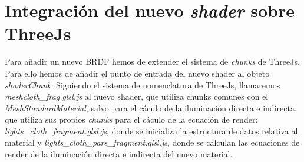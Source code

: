 




\vspace{1cm}
\section{Integraci\'on del nuevo \textit{shader} sobre ThreeJs}
  Para a\~nadir un nuevo BRDF hemos de extender el sistema de \textit{chunks} de ThreeJs. Para ello hemos de a\~nadir el
  punto de entrada del nuevo shader al objeto \textit{shaderChunk}. Siguiendo el sistema de nomenclatura de ThreeJs,
  llamaremos \textit{meshcloth\_frag.glsl.js} al nuevo shader, que utiliza chunks comunes con el \textit{MeshStandardMaterial},
  salvo para el c\'aculo de la iluminaci\'on directa e indirecta, que utiliza sus propios \textit{chunks} para el c\'aculo
  de la ecuaci\'on de render: \textit{lights\_cloth\_fragment.glsl.js}, donde se inicializa la estructura de datos relativa
  al material y \textit{lights\_cloth\_pars\_fragment.glsl.js}, donde se calculan las ecuaciones de render de la iluminaci\'on
  directa e indirecta del nuevo material.

